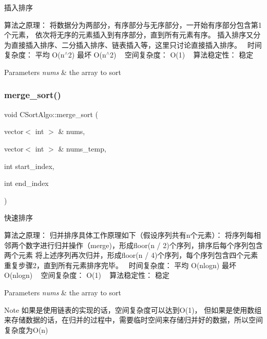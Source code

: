 插入排序 

算法之原理： 将数据分为两部分，有序部分与无序部分，一开始有序部分包含第1个元素， 依次将无序的元素插入到有序部分，直到所有元素有序。 插入排序又分为直接插入排序、二分插入排序、链表插入等，这里只讨论直接插入排序。~\newline
时间复杂度： 平均 O(n$^\wedge$2) 最坏 O(n$^\wedge$2) ~\newline
空间复杂度： O(1) ~\newline
算法稳定性： 稳定 ~\newline

\begin{DoxyParams}{Parameters}
{\em nums} & the array to sort \\
\hline
\end{DoxyParams}
\hypertarget{class_c_sort_algo_a25109772bb378cf42f34813e06d8a9d1}{}\label{class_c_sort_algo_a25109772bb378cf42f34813e06d8a9d1} 
\subsubsection{\texorpdfstring{merge\+\_\+sort()}{merge\_sort()}}
{\footnotesize\ttfamily void C\+Sort\+Algo\+::merge\+\_\+sort (\begin{DoxyParamCaption}\item[{vector$<$ int $>$ \&}]{nums,  }\item[{vector$<$ int $>$ \&}]{nums\+\_\+temp,  }\item[{int}]{start\+\_\+index,  }\item[{int}]{end\+\_\+index }\end{DoxyParamCaption})\hspace{0.3cm}{\ttfamily [private]}}



快速排序 

算法之原理： 归并排序具体工作原理如下（假设序列共有n个元素）： 将序列每相邻两个数字进行归并操作（merge)，形成floor(n / 2)个序列，排序后每个序列包含两个元素 将上述序列再次归并，形成floor(n / 4)个序列，每个序列包含四个元素 重复步骤2，直到所有元素排序完毕。~\newline
时间复杂度： 平均 O(nlogn) 最坏 O(nlogn) ~\newline
空间复杂度： O(1) ~\newline
算法稳定性： 稳定 ~\newline

\begin{DoxyParams}{Parameters}
{\em nums} & the array to sort \\
\hline
\end{DoxyParams}
\begin{DoxyNote}{Note}
如果是使用链表的实现的话，空间复杂度可以达到\+O(1)， 但如果是使用数组来存储数据的话，在归并的过程中，需要临时空间来存储归并好的数据，所以空间复杂度为\+O(n) 
\end{DoxyNote}
\hypertarget{class_c_sort_algo_a73fd2ee73bc017fdd76eb8bdab10c02d}{}\label{class_c_sort_algo_a73fd2ee73bc017fdd76eb8bdab10c02d} 
